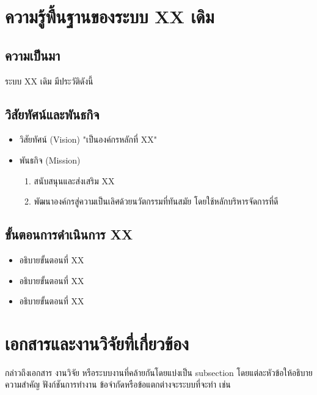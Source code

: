 

















	\section{ความรู้พื้นฐานของระบบ XX เดิม}
		 \subsection{ความเป็นมา}

      ระบบ XX เดิม มีประวัติดังนี้ 
		  
		  \subsection{วิสัยทัศน์และพันธกิจ}
		  \begin{itemize}
			  \item วิสัยทัศน์ (Vision)
			  "เป็นองค์กรหลักที่ XX"
			  
			  \item พันธกิจ (Mission)
			  \begin{enumerate}
			  	\item สนับสนุนและส่งเสริม XX 
			  	\item พัฒนาองค์กรสู่ความเป็นเลิศด้วยนวัตกรรมที่ทันสมัย โดยใช้หลักบริหารจัดการที่ดี
			  \end{enumerate}
		  \end{itemize}
	  
	  \subsection{ขั้นตอนการดำเนินการ XX}
	  \begin{itemize}
	  	\item อธิบายขั้นตอนที่ XX
	  	\item อธิบายขั้นตอนที่ XX
	  	\item อธิบายขั้นตอนที่ XX
	  \end{itemize}
	  

	\section{เอกสารและงานวิจัยที่เกี่ยวข้อง}
		  กล่าวถึงเอกสาร งานวิจัย หรือระบบงานที่คล้ายกันโดยแบ่งเป็น subsection โดยแต่ละหัวข้อให้อธิบายความสำคัญ ฟังก์ชันการทำงาน ข้อจำกัดหรือข้อแตกต่างจะระบบที่จะทำ เช่น
